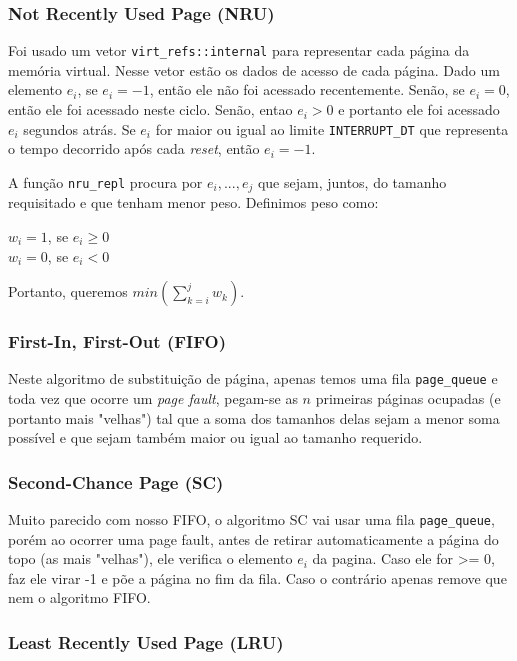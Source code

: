 \documentclass{beamer}
\begin{document}

\begin{frame}
  \frametitle{Not Recently Used Page (NRU)}
  Foi usado um vetor \texttt{virt\_refs::internal} para representar cada página da memória virtual.
  Nesse vetor estão os dados de acesso de cada página. Dado um elemento $e_i$, se $e_i=-1$, então
  ele não foi acessado recentemente. Senão, se $e_i=0$, então ele foi acessado neste ciclo. Senão,
  entao $e_i>0$ e portanto ele foi acessado $e_i$ segundos atrás. Se $e_i$ for maior ou igual ao
  limite \texttt{INTERRUPT\_DT} que representa o tempo decorrido após cada \textit{reset}, então
  $e_i=-1$.

  A função \texttt{nru\_repl} procura por $e_i,...,e_j$ que sejam, juntos, do tamanho requisitado e
  que tenham menor peso. Definimos peso como:

  $w_i = 1$, se $e_i \geq 0$ \\
  $w_i = 0$, se $e_i < 0$

  Portanto, queremos $min(\sum_{k=i}^j w_k)$.
\end{frame}


\begin{frame}
  \frametitle{First-In, First-Out (FIFO)}
  Neste algoritmo de substituição de página, apenas temos uma fila \texttt{page\_queue} e toda vez
  que ocorre um \textit{page fault}, pegam-se as $n$ primeiras páginas ocupadas (e portanto mais
  "velhas") tal que a soma dos tamanhos delas sejam a menor soma possível e que sejam também maior
  ou igual ao tamanho requerido.
\end{frame}


\begin{frame}
\frametitle{Second-Chance Page (SC)}
Muito parecido com nosso FIFO, o algoritmo SC vai usar uma fila \texttt{page\_queue}, porém ao ocorrer uma page fault, antes de retirar automaticamente a página do topo (as mais "velhas"), ele verifica o elemento $e_i$ da pagina. Caso ele for >= 0, faz ele virar -1 e põe a página no fim da fila. Caso o contrário apenas remove que nem o algoritmo FIFO.
\end{frame}


\begin{frame}
\frametitle{Least Recently Used Page (LRU)}

\end{frame}
\end{document}
